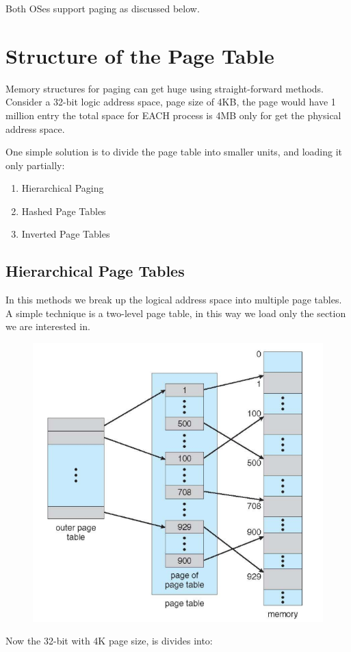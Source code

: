 Both OSes support paging as discussed below.


\section{Structure of the Page Table}

Memory structures for paging can get huge using straight-forward methods. Consider a 32-bit logic address space, page size of 4KB, the page would have 1 million entry the total space for EACH process is 4MB only for get the physical address
space.

One simple solution is to divide the page table into smaller units, and loading it only partially: 

\begin{enumerate}
    \item Hierarchical Paging
    \item Hashed Page Tables
    \item Inverted Page Tables
\end{enumerate}


\subsection{Hierarchical Page Tables}

In this methods we break up the logical address space into multiple page tables. A simple technique is a two-level page table, in this way we load only the section we are interested in.

\begin{figure}[h!]
    \centering
    \includegraphics[width=0.6\linewidth]{img/sbdf.png}
\end{figure}

Now the 32-bit with 4K page size, is divides into:

